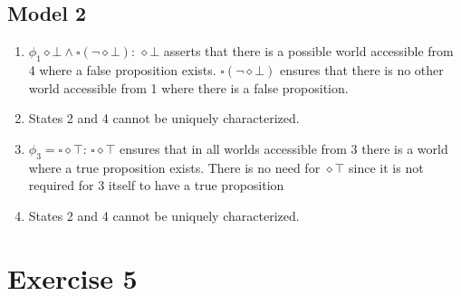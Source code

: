 \documentclass[11pt]{exam}
\begin{document}
\subsection*{Model 2}
\begin{enumerate}
    \item \(\phi_1 \diamond \bot \wedge \square (\neg \diamond \bot)\): \(\diamond \bot\) asserts that there is a possible world accessible from 4 where a false proposition exists. \(\square (\neg \diamond \bot)\) ensures that there is no other world accessible from 1 where there is a false proposition.
    \item States 2 and 4 cannot be uniquely characterized.
    \item \(\phi_3 = \square \diamond \top\): \(\square \diamond \top\) ensures that in all worlds accessible from 3 there is a world where a true proposition exists. There is no need for \(\diamond \top\) since it is not required for 3 itself to have a true proposition
    \item States 2 and 4 cannot be uniquely characterized.
\end{enumerate}
\section*{Exercise 5}
\end{document}
